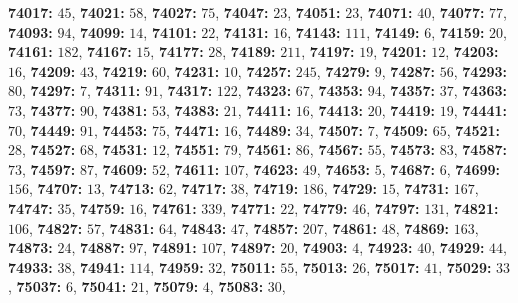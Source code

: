 \textsf{\bfseries 74017:} $45$, \textsf{\bfseries 74021:} $58$, \textsf{\bfseries 74027:} $75$, \textsf{\bfseries 74047:} $23$, \textsf{\bfseries 74051:} $23$, \textsf{\bfseries 74071:} $40$, \textsf{\bfseries 74077:} $77$, \textsf{\bfseries 74093:} $94$, \textsf{\bfseries 74099:} $14$, \textsf{\bfseries 74101:} $22$, \textsf{\bfseries 74131:} $16$, \textsf{\bfseries 74143:} $111$, \textsf{\bfseries 74149:} $6$, \textsf{\bfseries 74159:} $20$, \textsf{\bfseries 74161:} $182$, \textsf{\bfseries 74167:} $15$, \textsf{\bfseries 74177:} $28$, \textsf{\bfseries 74189:} $211$, \textsf{\bfseries 74197:} $19$, \textsf{\bfseries 74201:} $12$, \textsf{\bfseries 74203:} $16$, \textsf{\bfseries 74209:} $43$, \textsf{\bfseries 74219:} $60$, \textsf{\bfseries 74231:} $10$, \textsf{\bfseries 74257:} $245$, \textsf{\bfseries 74279:} $9$, \textsf{\bfseries 74287:} $56$, \textsf{\bfseries 74293:} $80$, \textsf{\bfseries 74297:} $7$, \textsf{\bfseries 74311:} $91$, \textsf{\bfseries 74317:} $122$, \textsf{\bfseries 74323:} $67$, \textsf{\bfseries 74353:} $94$, \textsf{\bfseries 74357:} $37$, \textsf{\bfseries 74363:} $73$, \textsf{\bfseries 74377:} $90$, \textsf{\bfseries 74381:} $53$, \textsf{\bfseries 74383:} $21$, \textsf{\bfseries 74411:} $16$, \textsf{\bfseries 74413:} $20$, \textsf{\bfseries 74419:} $19$, \textsf{\bfseries 74441:} $70$, \textsf{\bfseries 74449:} $91$, \textsf{\bfseries 74453:} $75$, \textsf{\bfseries 74471:} $16$, \textsf{\bfseries 74489:} $34$, \textsf{\bfseries 74507:} $7$, \textsf{\bfseries 74509:} $65$, \textsf{\bfseries 74521:} $28$, \textsf{\bfseries 74527:} $68$, \textsf{\bfseries 74531:} $12$, \textsf{\bfseries 74551:} $79$, \textsf{\bfseries 74561:} $86$, \textsf{\bfseries 74567:} $55$, \textsf{\bfseries 74573:} $83$, \textsf{\bfseries 74587:} $73$, \textsf{\bfseries 74597:} $87$, \textsf{\bfseries 74609:} $52$, \textsf{\bfseries 74611:} $107$, \textsf{\bfseries 74623:} $49$, \textsf{\bfseries 74653:} $5$, \textsf{\bfseries 74687:} $6$, \textsf{\bfseries 74699:} $156$, \textsf{\bfseries 74707:} $13$, \textsf{\bfseries 74713:} $62$, \textsf{\bfseries 74717:} $38$, \textsf{\bfseries 74719:} $186$, \textsf{\bfseries 74729:} $15$, \textsf{\bfseries 74731:} $167$, \textsf{\bfseries 74747:} $35$, \textsf{\bfseries 74759:} $16$, \textsf{\bfseries 74761:} $339$, \textsf{\bfseries 74771:} $22$, \textsf{\bfseries 74779:} $46$, \textsf{\bfseries 74797:} $131$, \textsf{\bfseries 74821:} $106$, \textsf{\bfseries 74827:} $57$, \textsf{\bfseries 74831:} $64$, \textsf{\bfseries 74843:} $47$, \textsf{\bfseries 74857:} $207$, \textsf{\bfseries 74861:} $48$, \textsf{\bfseries 74869:} $163$, \textsf{\bfseries 74873:} $24$, \textsf{\bfseries 74887:} $97$, \textsf{\bfseries 74891:} $107$, \textsf{\bfseries 74897:} $20$, \textsf{\bfseries 74903:} $4$, \textsf{\bfseries 74923:} $40$, \textsf{\bfseries 74929:} $44$, \textsf{\bfseries 74933:} $38$, \textsf{\bfseries 74941:} $114$, \textsf{\bfseries 74959:} $32$, \textsf{\bfseries 75011:} $55$, \textsf{\bfseries 75013:} $26$, \textsf{\bfseries 75017:} $41$, \textsf{\bfseries 75029:} $33$, \textsf{\bfseries 75037:} $6$, \textsf{\bfseries 75041:} $21$, \textsf{\bfseries 75079:} $4$, \textsf{\bfseries 75083:} $30$, 
